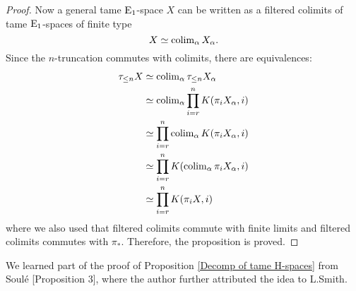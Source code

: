 \begin{proof}
Now a general tame $\operatorname{E}_1$-space $X$ can be written as a filtered colimits of tame $\operatorname{E}_1$-spaces of finite type
$$
X\simeq \operatorname{colim}_{\alpha} X_{\alpha}.
$$
Since the $n$-truncation commutes with colimits, there are equivalences:
\begin{align*}
 \tau_{\leq n} X & \simeq \operatorname{colim}_{\alpha} \tau_{\leq n} X_{\alpha}\\
 & \simeq \operatorname{colim}_{\alpha} \prod^{n}_{i=r}K(\pi_iX_{\alpha} , i)\\
 & \simeq \prod^{n}_{i=r} \operatorname{colim}_{\alpha}K(\pi_{i}X_{\alpha},i)\\
 & \simeq \prod^{n}_{i=r} K(\operatorname{colim}_{\alpha}\pi_{i}X_{\alpha},i)\\
 & \simeq \prod^{n}_{i=r} K(\pi_{i}X,i)\\
\end{align*}
where we also used that filtered colimits commute with finite limits and filtered colimits commutes with $\pi_*$.
Therefore, the proposition is proved.
\end{proof}
\begin{remark}
		We learned part of the proof of Proposition \ref{Decomp of tame H-spaces} from Soul\'e \cite{soule}[Proposition 3], where the author further attributed the idea to L.Smith.	 
\end{remark}

